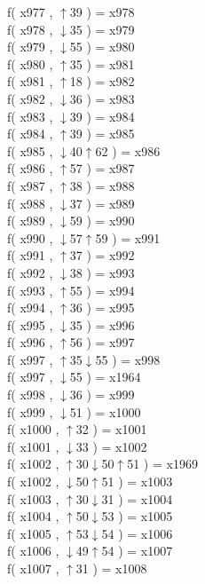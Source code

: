 f( x977 , $\uparrow$39 ) = x978 \\
f( x978 , $\downarrow$35 ) = x979 \\
f( x979 , $\downarrow$55 ) = x980 \\
f( x980 , $\uparrow$35 ) = x981 \\
f( x981 , $\uparrow$18 ) = x982 \\
f( x982 , $\downarrow$36 ) = x983 \\
f( x983 , $\downarrow$39 ) = x984 \\
f( x984 , $\uparrow$39 ) = x985 \\
f( x985 , $\downarrow$40$\uparrow$62 ) = x986 \\
f( x986 , $\uparrow$57 ) = x987 \\
f( x987 , $\uparrow$38 ) = x988 \\
f( x988 , $\downarrow$37 ) = x989 \\
f( x989 , $\downarrow$59 ) = x990 \\
f( x990 , $\downarrow$57$\uparrow$59 ) = x991 \\
f( x991 , $\uparrow$37 ) = x992 \\
f( x992 , $\downarrow$38 ) = x993 \\
f( x993 , $\uparrow$55 ) = x994 \\
f( x994 , $\uparrow$36 ) = x995 \\
f( x995 , $\downarrow$35 ) = x996 \\
f( x996 , $\uparrow$56 ) = x997 \\
f( x997 , $\uparrow$35$\downarrow$55 ) = x998 \\
f( x997 , $\downarrow$55 ) = x1964 \\
f( x998 , $\downarrow$36 ) = x999 \\
f( x999 , $\downarrow$51 ) = x1000 \\
f( x1000 , $\uparrow$32 ) = x1001 \\
f( x1001 , $\downarrow$33 ) = x1002 \\
f( x1002 , $\uparrow$30$\downarrow$50$\uparrow$51 ) = x1969 \\
f( x1002 , $\downarrow$50$\uparrow$51 ) = x1003 \\
f( x1003 , $\uparrow$30$\downarrow$31 ) = x1004 \\
f( x1004 , $\uparrow$50$\downarrow$53 ) = x1005 \\
f( x1005 , $\uparrow$53$\downarrow$54 ) = x1006 \\
f( x1006 , $\downarrow$49$\uparrow$54 ) = x1007 \\
f( x1007 , $\uparrow$31 ) = x1008 \\
